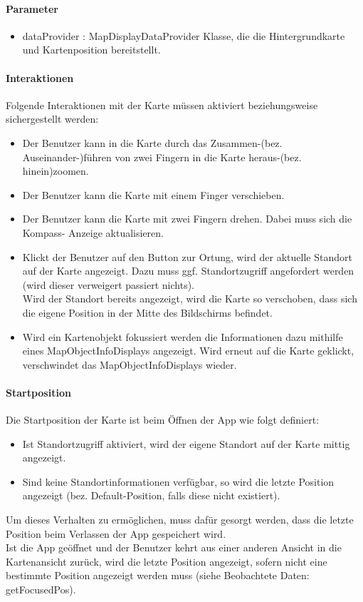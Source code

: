 \paragraph*{Parameter}
\begin{itemize}
    \item dataProvider : MapDisplayDataProvider Klasse, die die Hintergrundkarte und Kartenposition bereitstellt.
\end{itemize}

\paragraph*{Interaktionen}
Folgende Interaktionen mit der Karte müssen aktiviert beziehungsweise sichergestellt werden:
\begin{itemize}
    \item Der Benutzer kann in die Karte durch das Zusammen-(bez. Auseinander-)führen von zwei 
    Fingern in die Karte heraus-(bez. hinein)zoomen.
    \item Der Benutzer kann die Karte mit einem Finger verschieben.
    \item Der Benutzer kann die Karte mit zwei Fingern drehen. Dabei muss sich die Kompass-
    Anzeige aktualisieren.
    \item Klickt der Benutzer auf den Button zur Ortung, wird der aktuelle Standort auf der Karte 
    angezeigt. Dazu muss ggf. Standortzugriff angefordert werden (wird dieser verweigert passiert 
    nichts).\\
    Wird der Standort bereits angezeigt, wird die Karte so verschoben, dass sich die eigene Position 
    in der Mitte des Bildschirms befindet. \\
    \item Wird ein Kartenobjekt fokussiert werden die Informationen dazu mithilfe eines MapObjectInfoDisplays angezeigt. 
    Wird erneut auf die Karte geklickt, verschwindet das MapObjectInfoDisplays wieder.

\end{itemize}

\paragraph*{Startposition}
Die Startposition der Karte ist beim Öffnen der App wie folgt definiert:
\begin{itemize}
    \item Ist Standortzugriff aktiviert, wird der eigene Standort auf der Karte mittig angezeigt.
    \item Sind keine Standortinformationen verfügbar, so wird die letzte Position angezeigt 
    (bez. Default-Position, falls diese nicht existiert).
\end{itemize}
Um dieses Verhalten zu ermöglichen, muss dafür gesorgt werden, dass die letzte Position beim Verlassen 
der App gespeichert wird.\\
Ist die App geöffnet und der Benutzer kehrt aus einer anderen Ansicht in die Kartenansicht zurück,
wird die letzte Position angezeigt, sofern nicht eine bestimmte Position angezeigt werden muss 
(siehe Beobachtete Daten: getFocusedPos).


